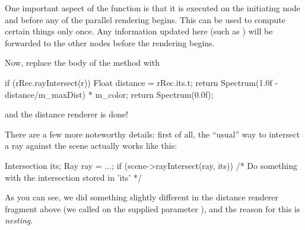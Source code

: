 One important aspect of the  function is that it is executed 
on the initiating node and before any of the parallel rendering begins. 
This can be used to compute certain things only once. Any
information updated here (such as ) will be forwarded to the
other nodes before the rendering begins.

Now, replace the body of the  method with 
\begin{cpp}
	if (rRec.rayIntersect(r)) {
		Float distance = rRec.its.t;
		return Spectrum(1.0f - distance/m_maxDist) * m_color;
	}
	return Spectrum(0.0f);
\end{cpp}
and the distance renderer is done!
\begin{center}
\end{center}
There are a few more noteworthy details: first of all, the ``usual'' way
to intersect a ray against the scene actually works like this:
\begin{cpp}
	Intersection its;
	Ray ray = ...;
	if (scene->rayIntersect(ray, its)) {
		/* Do something with the intersection stored in 'its' */
	}
\end{cpp}
As you can see, we did something slightly different in the distance 
renderer fragment above (we called 
on the supplied parameter ), and the reason for this is \emph{nesting}.
